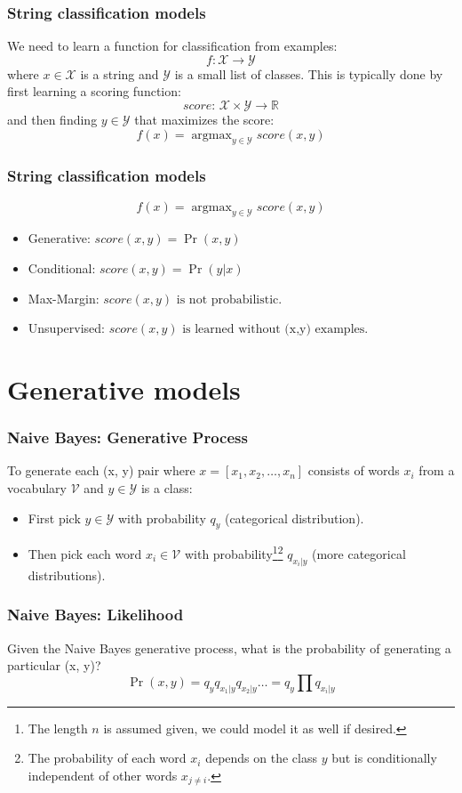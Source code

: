 \documentclass[ignorenonframetext,plain]{beamer}
\newcommand{\vocab}{\mathcal{V}}
\DeclareMathOperator*{\argmax}{argmax}
\newcommand{\score}{\mathit{score}}
\begin{document}
\begin{frame}\frametitle{String classification models}
We need to learn a function for classification from examples:\[
f: \mathcal{X}\rightarrow\mathcal{Y}
\] where $x\in\mathcal{X}$ is a string and
$\mathcal{Y}$ is a small list of classes.  This is typically done
by first learning a scoring function:\[
\score:\, \mathcal{X}\times\mathcal{Y}\rightarrow\mathbb{R}
\] and then finding $y\in\mathcal{Y}$ that maximizes the score:\[
f(x) = \argmax_{y\in\mathcal{Y}}\score(x, y)
\]
\end{frame}

\begin{frame}\frametitle{String classification models}
\[
f(x) = \argmax_{y\in\mathcal{Y}}\score(x, y)
\]
\begin{itemize}
\item Generative: $
\score(x, y) = \Pr(x, y)
$
\item Conditional: $
\score(x, y) = \Pr(y | x)
$
\item Max-Margin: $
\score(x, y) \mbox{ is not probabilistic.}
$
\item Unsupervised: $
\score(x, y) \mbox{ is learned without (x,y) examples.}
$
\end{itemize}
\end{frame}

\section{Generative models}
\frame{\sectionpage}

\begin{frame}\frametitle{Naive Bayes: Generative Process}
To generate each (x, y) pair where $x = [x_1, x_2, \dots, x_n]$
consists of words $x_i$ from a vocabulary $\vocab$ and
$y\in\mathcal{Y}$ is a class:
\begin{itemize}
\item First pick $y\in\mathcal{Y}$ with probability $q_y$ (categorical
  distribution).
\item Then pick each word $x_i\in\vocab$ with probability\footnote{The
  length $n$ is assumed given, we could model it as well if
  desired.}\footnote{The probability of each word $x_i$ depends on the
  class $y$ but is conditionally independent of other words
  $x_{j\neq i}$.} $q_{x_i|y}$ (more categorical distributions).
\end{itemize}
\end{frame}

\begin{frame}\frametitle{Naive Bayes: Likelihood}
Given the Naive Bayes generative process, what is the probability of
generating a particular (x, y)?\[ \Pr(x, y) = q_y q_{x_1|y} q_{x_2|y}
\dots = q_y \prod q_{x_i|y}
\]
\end{frame}
\end{document}

